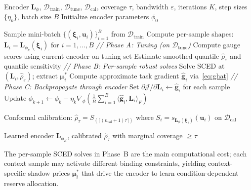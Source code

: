 \documentclass[11pt]{article}
\newcommand{\cD}{\mathcal{D}}
\newcommand{\bmu}{\bm{\mu}}
\newcommand{\bu}{\bm{u}}
\newcommand{\bxi}{\bm{\xi}}
\newcommand{\bL}{\bm{L}}
\newcommand{\bg}{\bm{g}}
\newcommand{\ipF}[2]{\langle #1, #2 \rangle_F}
\theoremstyle{definition}
\begin{document}
\begin{algorithm}[!t]
\caption{Contextual Profiled Gradient Training}
\label{alg:contextual}
\begin{algorithmic}[1]
\REQUIRE Encoder $\bL_\phi$, $\cD_{\text{train}}$, $\cD_{\text{tune}}$, $\cD_{\text{cal}}$, coverage $\tau$, bandwidth $\varepsilon$, iterations $K$, step sizes $\{\eta_k\}$, batch size $B$
\STATE Initialize encoder parameters $\phi_0$

    \STATE Sample mini-batch $\{(\bxi_i, \bu_i)\}_{i=1}^B$ from $\cD_{\text{train}}$
    \STATE Compute per-sample shapes: $\bL_i = \bL_{\phi_k}(\bxi_i)$ for $i = 1,\ldots,B$
    \STATE \textit{// Phase A: Tuning (on $\cD_{\text{tune}}$)}
    \STATE Compute gauge scores using current encoder on tuning set
    \STATE Estimate smoothed quantile $\hat{\rho}_\varepsilon$ and quantile sensitivity
    \STATE \textit{// Phase B: Per-sample robust solves}
        \STATE Solve SCED at $(\bL_i, \hat{\rho}_\varepsilon)$; extract $\bmu_i^*$
        \STATE Compute approximate task gradient $\hat{\bg}_i$ via~\eqref{eq:ghat}
    \ENDFOR
    \STATE \textit{// Phase C: Backpropagate through encoder}
    \STATE Set $\partial \mathcal{J} / \partial \bL_i \leftarrow \hat{\bg}_i$ for each sample
    \STATE Update $\phi_{k+1} \leftarrow \phi_k - \eta_k \nabla_\phi \left(\frac{1}{B}\sum_{i=1}^B \ipF{\hat{\bg}_i}{\bL_i} \right)$
\ENDFOR

\STATE Conformal calibration: $\hat{\rho}_\tau = S_{(\lceil(n_{\text{cal}}+1)\tau\rceil)}$ where $S_i = s_{\bL_\phi(\bxi_i)}(\bu_i)$ on $\cD_{\text{cal}}$

\ENSURE Learned encoder $\bL_{\phi_K}$, calibrated $\hat{\rho}_\tau$ with marginal coverage $\geq \tau$
\end{algorithmic}
\end{algorithm}

The per-sample SCED solves in Phase~B are the main computational cost; each context sample may activate different binding constraints, yielding context-specific shadow prices $\bmu_i^*$ that drive the encoder to learn condition-dependent reserve allocation.
\end{document}
